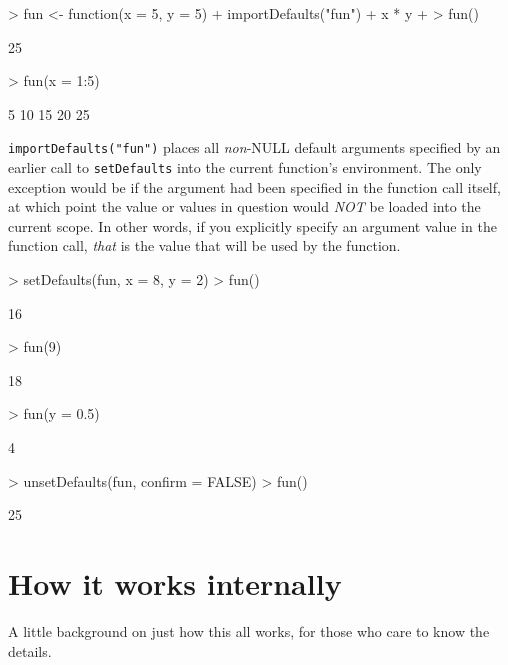 \documentclass{article}
\begin{document}
\begin{Schunk}
\begin{Sinput}
> fun <- function(x = 5, y = 5) {
+     importDefaults("fun")
+     x * y
+ }
> fun()
\end{Sinput}
\begin{Soutput}
[1] 25
\end{Soutput}
\begin{Sinput}
> fun(x = 1:5)
\end{Sinput}
\begin{Soutput}
[1]  5 10 15 20 25
\end{Soutput}
\end{Schunk}

\vspace{2mm}
\noindent
{\tt importDefaults("fun")} places all {\it non}-NULL default
arguments specified by an earlier call to 
{\tt setDefaults} into the current function's environment.
The only exception would be if the argument had been specified
in the function call itself, at which point the value or values
in question would {\em NOT} be loaded into the current scope.
In other words, if you explicitly specify an argument value in
the function call, {\em that} is the value that will be
used by the function.

\begin{Schunk}
\begin{Sinput}
> setDefaults(fun, x = 8, y = 2)
> fun()
\end{Sinput}
\begin{Soutput}
[1] 16
\end{Soutput}
\begin{Sinput}
> fun(9)
\end{Sinput}
\begin{Soutput}
[1] 18
\end{Soutput}
\begin{Sinput}
> fun(y = 0.5)
\end{Sinput}
\begin{Soutput}
[1] 4
\end{Soutput}
\begin{Sinput}
> unsetDefaults(fun, confirm = FALSE)
> fun()
\end{Sinput}
\begin{Soutput}
[1] 25
\end{Soutput}
\end{Schunk}

\section{How it works internally}
A little background on just how this all works, for those who
care to know the details. 
\end{document}
